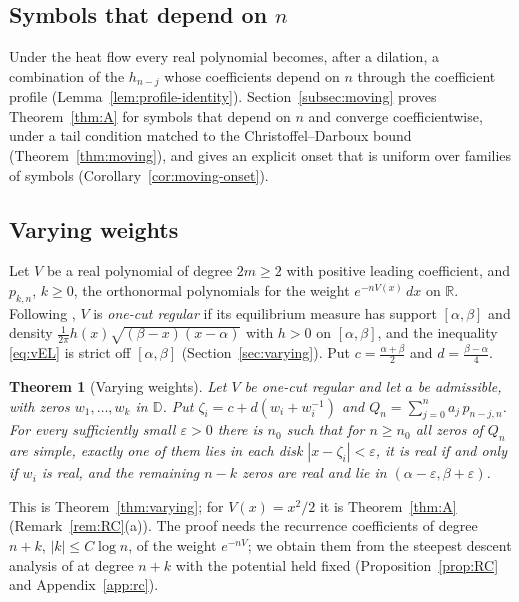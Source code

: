 \documentclass[11pt]{amsart}
\newtheorem{theorem}{Theorem}[section]
\theoremstyle{definition}
\theoremstyle{remark}
\numberwithin{equation}{section}
\newcommand{\R}{\mathbb{R}}
\newcommand{\D}{\mathbb{D}}
\newcommand{\eps}{\varepsilon}
\begin{document}
\subsection{Symbols that depend on \texorpdfstring{$n$}{n}}
Under the heat flow every real polynomial becomes, after a dilation, a combination of the $h_{n-j}$ whose coefficients depend on $n$ through the coefficient profile (Lemma~\ref{lem:profile-identity}). Section~\ref{subsec:moving} proves Theorem~\ref{thm:A} for symbols that depend on $n$ and converge coefficientwise, under a tail condition matched to the Christoffel--Darboux bound \cite[Lemma~\ref{M-lem:cd}]{Main} (Theorem~\ref{thm:moving}), and gives an explicit onset that is uniform over families of symbols (Corollary~\ref{cor:moving-onset}).

\subsection{Varying weights}
Let $V$ be a real polynomial of degree $2m\ge2$ with positive leading coefficient, and $p_{k,n}$, $k\ge0$, the orthonormal polynomials for the weight $e^{-nV(x)}\,dx$ on $\R$. Following \cite{BI}, $V$ is \emph{one-cut regular} if its equilibrium measure has support $[\alpha,\beta]$ and density $\frac1{2\pi}h(x)\sqrt{(\beta-x)(x-\alpha)}$ with $h>0$ on $[\alpha,\beta]$, and the inequality \eqref{eq:vEL} is strict off $[\alpha,\beta]$ (Section~\ref{sec:varying}). Put $c=\frac{\alpha+\beta}2$ and $d=\frac{\beta-\alpha}4$.

\begin{theorem}[Varying weights]\label{thm:varying-intro}
Let $V$ be one-cut regular and let $a$ be admissible, with zeros $w_1,\dots,w_k$ in $\D$. Put $\zeta_i=c+d(w_i+w_i^{-1})$ and $Q_n=\sum_{j=0}^{n}a_j\,p_{n-j,n}$. For every sufficiently small $\eps>0$ there is $n_0$ such that for $n\ge n_0$ all zeros of $Q_n$ are simple, exactly one of them lies in each disk $|x-\zeta_i|<\eps$, it is real if and only if $w_i$ is real, and the remaining $n-k$ zeros are real and lie in $(\alpha-\eps,\beta+\eps)$.
\end{theorem}

This is Theorem~\ref{thm:varying}; for $V(x)=x^2/2$ it is Theorem~\ref{thm:A} (Remark~\ref{rem:RC}(a)). The proof needs the recurrence coefficients of degree $n+k$, $|k|\le C\log n$, of the weight $e^{-nV}$; we obtain them from the steepest descent analysis of \cite{DKMVZ} at degree $n+k$ with the potential held fixed (Proposition~\ref{prop:RC} and Appendix~\ref{app:rc}).
\end{document}
